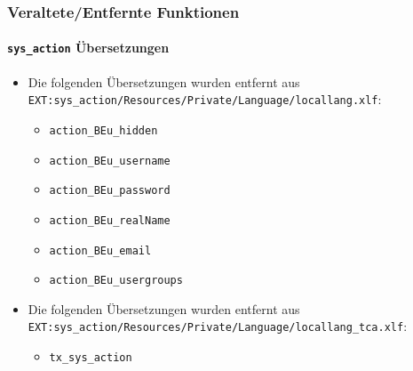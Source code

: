 \begin{frame}[fragile]
	\frametitle{Veraltete/Entfernte Funktionen}
	\framesubtitle{\texttt{sys\_action} Übersetzungen}

	\begin{itemize}
		\item Die folgenden Übersetzungen wurden entfernt aus
			\smaller\texttt{EXT:sys\_action/Resources/Private/Language/locallang.xlf}:\normalsize

		\begin{itemize}
			\item \texttt{action\_BEu\_hidden}
			\item \texttt{action\_BEu\_username}
			\item \texttt{action\_BEu\_password}
			\item \texttt{action\_BEu\_realName}
			\item \texttt{action\_BEu\_email}
			\item \texttt{action\_BEu\_usergroups}
		\end{itemize}

		\item Die folgenden Übersetzungen wurden entfernt aus
			\smaller\texttt{EXT:sys\_action/Resources/Private/Language/locallang\_tca.xlf}:\normalsize

		\begin{itemize}
			\item \texttt{tx\_sys\_action}
		\end{itemize}

	\end{itemize}

\end{frame}



